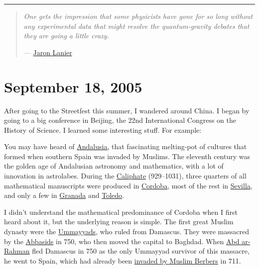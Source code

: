 \documentclass{article}
\begin{document}
\begin{center}\rule{0.5\linewidth}{0.5pt}\end{center}

\begin{quote}
\emph{One gets the impression that some physicists have gone for so long
without any experimental data that might resolve the quantum-gravity
debates that they are going a little crazy.}

---
\href{http://www.americanscientist.org/template/BookReviewTypeDetail/assetid/45919;jsessionid=baaayg8keWDBEI}{Jaron
Lanier}
\end{quote}



\hypertarget{week221}{%
\section{September 18, 2005}\label{week221}}

After going to the Streetfest this summer, I wandered around China. I
began by going to a big conference in Beijing, the 22nd International
Congress on the History of Science. I learned some interesting stuff.
For example:

You may have heard of
\href{http://en.wikipedia.org/wiki/Andalusia}{Andalusia,} that
fascinating melting-pot of cultures that formed when southern Spain was
invaded by Muslims. The eleventh century was the golden age of
Andalusian astronomy and mathematics, with a lot of innovation in
astrolabes. During the
\href{http://en.wikipedia.org/wiki/Timeline_of_the_Muslim_Occupation_of_the_Iberian_Peninsula}{Caliphate}
(929--1031), three quarters of all mathematical manuscripts were
produced in
\href{http://lexicorient.com/spain/photos/cordoba02.jpg}{Cordoba}, most
of the rest in
\href{http://images.encarta.msn.com/xrefmedia/sharemed/targets/images/pho/t054/T054900A.jpg}{Sevilla},
and only a few in
\href{http://lexicorient.com/spain/photos/granada02.jpg}{Granada} and
\href{http://hopf.chem.brandeis.edu/Milos/PhotoMD/Images/Spain2001/Toledo_Alcazar.JPG}{Toledo}.

I didn't understand the mathematical predominance of Cordoba when I
first heard about it, but the underlying reason is simple. The first
great Muslim dynasty were the
\href{http://en.wikipedia.org/wiki/Umayyads}{Ummayyads}, who ruled from
Damascus. They were massacred by the
\href{http://en.wikipedia.org/wiki/Abbasid}{Abbasids} in 750, who then
moved the capital to Baghdad. When
\href{http://en.wikipedia.org/wiki/Abd-ar-Rahman_I}{Abd ar-Rahman} fled
Damascus in 750 as the only Ummayyad survivor of this massacre, he went
to Spain, which had already been
\href{http://en.wikipedia.org/wiki/Muslim_conquest_of_Iberia}{invaded by
Muslim Berbers} in 711.
\end{document}
